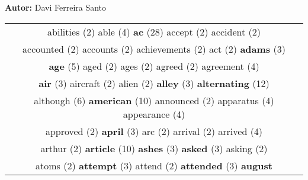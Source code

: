 \documentclass[12pt,a4paper]{article}
\begin{document}
\begin{center}
{\bf Autor:} {\sc Davi Ferreira Santo} \\
\vspace*{0.3cm}


\end{center}


\begin{center}
\begin{longtable}{|c|}
\hline
{\footnotesize \textcolor{Verde} {abilities}} \footnotesize{(2)} {\normalsize \textcolor{VerdeLocao} {able}} \footnotesize{(4)} {\Huge \textcolor{AzulEscuro} {\bf ac}} \footnotesize{(28)} {\footnotesize \textcolor{Verde} {accept}} \footnotesize{(2)} {\footnotesize \textcolor{Verde} {accident}} \footnotesize{(2)}  \\ {\footnotesize \textcolor{Verde} {accounted}} \footnotesize{(2)} {\footnotesize \textcolor{Verde} {accounts}} \footnotesize{(2)} {\footnotesize \textcolor{Verde} {achievements}} \footnotesize{(2)} {\footnotesize \textcolor{Verde} {act}} \footnotesize{(2)} {\small \textcolor{Laranja} {\bf adams}} \footnotesize{(3)}  \\ {\large \textcolor{Roxo} {\bf age}} \footnotesize{(5)} {\footnotesize \textcolor{Verde} {aged}} \footnotesize{(2)} {\footnotesize \textcolor{Verde} {ages}} \footnotesize{(2)} {\footnotesize \textcolor{Verde} {agreed}} \footnotesize{(2)} {\normalsize \textcolor{VerdeLocao} {agreement}} \footnotesize{(4)}  \\ {\small \textcolor{Laranja} {\bf air}} \footnotesize{(3)} {\footnotesize \textcolor{Verde} {aircraft}} \footnotesize{(2)} {\footnotesize \textcolor{Verde} {alien}} \footnotesize{(2)} {\small \textcolor{Laranja} {\bf alley}} \footnotesize{(3)} {\Huge \textcolor{AzulEscuro} {\bf alternating}} \footnotesize{(12)}  \\ {\Large \textcolor{VermEscuro} {although}} \footnotesize{(6)} {\Huge \textcolor{AzulEscuro} {\bf american}} \footnotesize{(10)} {\footnotesize \textcolor{Verde} {announced}} \footnotesize{(2)} {\normalsize \textcolor{VerdeLocao} {apparatus}} \footnotesize{(4)} {\normalsize \textcolor{VerdeLocao} {appearance}} \footnotesize{(4)}  \\ {\footnotesize \textcolor{Verde} {approved}} \footnotesize{(2)} {\small \textcolor{Laranja} {\bf april}} \footnotesize{(3)} {\footnotesize \textcolor{Verde} {arc}} \footnotesize{(2)} {\footnotesize \textcolor{Verde} {arrival}} \footnotesize{(2)} {\normalsize \textcolor{VerdeLocao} {arrived}} \footnotesize{(4)}  \\ {\footnotesize \textcolor{Verde} {arthur}} \footnotesize{(2)} {\Huge \textcolor{AzulEscuro} {\bf article}} \footnotesize{(10)} {\small \textcolor{Laranja} {\bf ashes}} \footnotesize{(3)} {\small \textcolor{Laranja} {\bf asked}} \footnotesize{(3)} {\footnotesize \textcolor{Verde} {asking}} \footnotesize{(2)}  \\ {\footnotesize \textcolor{Verde} {atoms}} \footnotesize{(2)} {\small \textcolor{Laranja} {\bf attempt}} \footnotesize{(3)} {\footnotesize \textcolor{Verde} {attend}} \footnotesize{(2)} {\small \textcolor{Laranja} {\bf attended}} \footnotesize{(3)} {\small \textcolor{Laranja} {\bf august}} 
\end{longtable}
\end{center}
\end{document}
